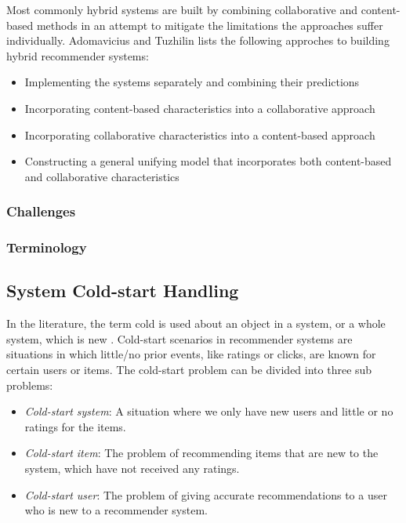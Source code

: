 Most commonly hybrid systems are built by combining collaborative and content-based methods in an attempt to mitigate the limitations the approaches suffer individually. Adomavicius and Tuzhilin \cite{Adomavicius2005} lists the following approches to building hybrid recommender systems:

\begin{itemize}
\item Implementing the systems separately and combining their predictions
\item Incorporating content-based characteristics into a collaborative approach
\item Incorporating collaborative characteristics into a content-based approach
\item Constructing a general unifying model that incorporates both content-based and collaborative characteristics
\end{itemize}

\subsubsection{Challenges}



\subsubsection{Terminology}



\subsection{System Cold-start Handling}

In the literature, the term cold is used about an object in a system, or a
whole system, which is new \cite{Schein2002, Park2006}. Cold-start scenarios in recommender systems are
situations in which little/no prior events, like ratings or clicks, are known
for certain users or items. The cold-start problem can be divided into three sub problems:

\begin{itemize}
  \item \emph{Cold-start system}: A situation where we only have new users and
  little or no ratings for the items.

  \item \emph{Cold-start item}: The problem of recommending items that are new
  to the system, which have not received any ratings. 

  \item \emph{Cold-start user}: The problem of giving accurate recommendations
  to a user who is new to a recommender system.
\end{itemize}

